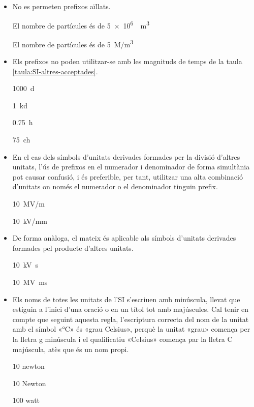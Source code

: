 \begin{itemize}
\item No es permeten prefixos aïllats.

\textcolor{Green}\faCheckSquare{} El nombre de partícules és de \qty[per-mode = symbol]{5e6}{\per\cubic\metre}

\textcolor{Red}\faTimesCircle{} El nombre de partícules és de \qty{5}{M/m^3}


\item Els prefixos no poden utilitzar-se amb les magnituds  de temps de la taula \vref{taula:SI-altres-acceptades}.

\textcolor{Green}\faCheckSquare{} \qty{1000}{d}

\textcolor{Red}\faTimesCircle{}  \qty{1}{kd}

\textcolor{Green}\faCheckSquare{} \qty{0,75}{h}

\textcolor{Red}\faTimesCircle{}  \qty{75}{ch}


\item En el cas dels símbols d'unitats derivades formades per la divisió
d'altres unitats, l'ús de prefixos en el numerador i denominador de
forma simultània pot causar confusió, i és preferible, per tant,
utilitzar una alta combinació d'unitats on només el numerador o el
denominador tinguin prefix.

\textcolor{Green}\faCheckSquare{} \qty{10}{MV/m}

\textcolor{Blue}\faExclamationTriangle{}  \qty{10}{kV/mm}


\item De forma anàloga, el mateix és aplicable als símbols d'unitats
derivades formades pel producte d'altres unitats.

\textcolor{Green}\faCheckSquare{} \qty{10}{kV.s}

\textcolor{Blue}\faExclamationTriangle{}  \qty{10}{MV.ms}


\item Els noms de totes les unitats de l'SI s'escriuen amb minúscula, llevat que estiguin a l'inici d'una oració o en un títol tot amb majúscules. Cal tenir en compte que seguint aquesta regla, l'escriptura  correcta
del nom de la unitat amb el símbol «\unit{\degreeCelsius}» és «grau Celsius», perquè la unitat  «grau» comença per la lletra g  minúscula i el qualificatiu «Celsius» comença par la lletra C  majúscula, atès que és un nom propi.


\textcolor{Green}\faCheckSquare{} 10 newton

\textcolor{Red}\faTimesCircle{} 10 Newton

\textcolor{Green}\faCheckSquare{}  100 watt


\end{itemize}
